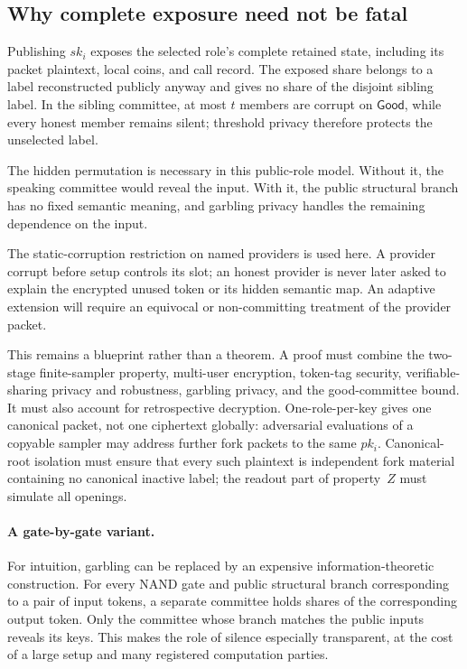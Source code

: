 \subsection{Why complete exposure need not be fatal}

Publishing $sk_i$ exposes the selected role's complete retained state,
including its packet plaintext, local coins, and call record.  The exposed
share belongs to a label reconstructed publicly anyway and gives no share of
the disjoint sibling label.  In the sibling committee, at most $t$ members are
corrupt on $\mathsf{Good}$, while every honest member remains silent;
threshold privacy therefore protects the unselected label.

The hidden permutation is necessary in this public-role model.  Without it,
the speaking committee would reveal the input.  With it, the public structural
branch has no fixed semantic meaning, and garbling privacy handles the
remaining dependence on the input.

The static-corruption restriction on named providers is used here.  A
provider corrupt before setup controls its slot; an honest provider is never
later asked to explain the encrypted unused token or its hidden semantic map.
An adaptive extension will require an equivocal or non-committing treatment of
the provider packet.

This remains a blueprint rather than a theorem.  A proof must combine the
two-stage finite-sampler property, multi-user encryption, token-tag security,
verifiable-sharing privacy and robustness, garbling privacy, and the
good-committee bound.  It must also account for retrospective decryption.
One-role-per-key gives one canonical packet, not one ciphertext globally:
adversarial evaluations of a copyable sampler may address further fork
packets to the same $pk_i$.  Canonical-root isolation must ensure that every
such plaintext is independent fork material containing no canonical inactive
label; the readout part of property~$Z$ must simulate all openings.

\paragraph{A gate-by-gate variant.}
For intuition, garbling can be replaced by an expensive
information-theoretic construction.  For every NAND gate and public
structural branch corresponding to a pair of input tokens, a separate
committee holds shares of the corresponding output token.  Only the committee
whose branch matches the public inputs reveals its keys.  This makes the role
of silence especially transparent, at the cost of a large setup and many
registered computation parties.
